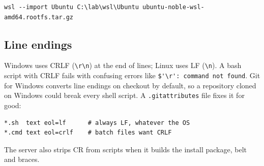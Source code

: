 \begin{verbatim}
wsl --import Ubuntu C:\lab\wsl\Ubuntu ubuntu-noble-wsl-amd64.rootfs.tar.gz
\end{verbatim}

\subsection{Line endings}

Windows uses CRLF (\verb|\r\n|) at the end of lines; Linux uses LF
(\verb|\n|). A bash script with CRLF fails with confusing errors like
\verb|$'\r': command not found|. Git for Windows converts line endings on
checkout by default, so a repository cloned on Windows could break every shell
script. A \texttt{.gitattributes} file fixes it for good:

\begin{verbatim}
*.sh  text eol=lf      # always LF, whatever the OS
*.cmd text eol=crlf    # batch files want CRLF
\end{verbatim}

The server also strips CR from scripts when it builds the install package,
belt and braces.
